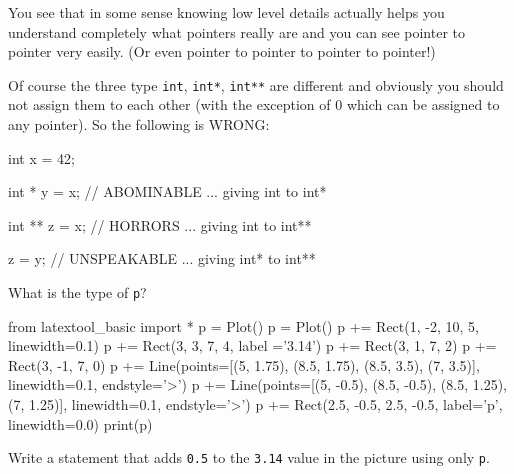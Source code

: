 You see that in some sense knowing low level details actually helps you understand completely what pointers really are and you can see pointer to pointer very easily. (Or even pointer to pointer to pointer to pointer!)

Of course the three type \texttt{int}, \texttt{int*}, \texttt{int**} are different and obviously you should not assign them to each other (with the exception of 0 which can be assigned to any pointer). So the following is WRONG:

\begin{consolethree}[escapeinside=||]
int x = 42;

int * y = x;    // ABOMINABLE ... giving int to int*

int ** z = x;   // HORRORS ... giving int to int**

z = y;          // UNSPEAKABLE ... giving int* to int** 
\end{consolethree}

\begin{ex}
What is the type of \texttt{p}?

\begin{python}
from latextool_basic import *
p = Plot()
p = Plot()
p += Rect(1, -2, 10, 5, linewidth=0.1)
p += Rect(3, 3, 7, 4, label ='3.14')
p += Rect(3, 1, 7, 2)
p += Rect(3, -1, 7, 0)
p += Line(points=[(5, 1.75), (8.5, 1.75), (8.5, 3.5), (7, 3.5)], linewidth=0.1, endstyle='>')
p += Line(points=[(5, -0.5), (8.5, -0.5), (8.5, 1.25), (7, 1.25)], linewidth=0.1, endstyle='>')
p += Rect(2.5, -0.5, 2.5, -0.5, label='p', linewidth=0.0)
print(p)
\end{python}


Write a statement that adds \texttt{0.5} to the \texttt{3.14} value in the picture using only \texttt{p}.
\end{ex}

